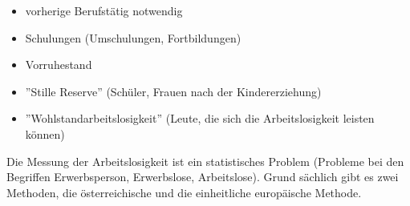 \documentclass[a4paper]{report}
\begin{document}
\begin{itemize}
\item vorherige Berufstätig notwendig
\item Schulungen (Umschulungen, Fortbildungen)
\item Vorruhestand 
\item ''Stille Reserve'' (Schüler, Frauen nach der Kindererziehung)
\item ''Wohlstandarbeitslosigkeit'' (Leute, die sich die Arbeitslosigkeit leisten können)
\end{itemize}

Die Messung der Arbeitslosigkeit ist ein statistisches Problem (Probleme bei den Begriffen Erwerbsperson, Erwerbslose, Arbeitslose). Grund sächlich gibt es zwei Methoden, die österreichische und die einheitliche europäische Methode.
\end{document}
